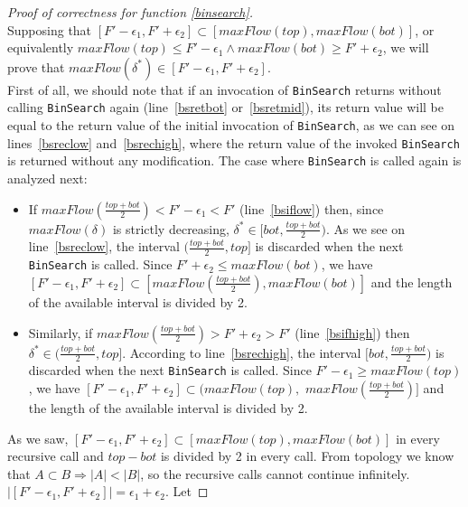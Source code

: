 \documentclass[11pt]{article}
\theoremstyle{definition}
\theoremstyle{corollary}
\theoremstyle{lemma}
\begin{document}
    \begin{proof}[Proof of correctness for function \ref{binsearch}] \ \\
       Supposing that $[F' - \epsilon_1, F' + \epsilon_2] \subset [maxFlow(top),maxFlow(bot)]$, or equivalently
       $maxFlow(top) \leq F' - \epsilon_1 \wedge maxFlow(bot) \geq F' + \epsilon_2$, we will prove that
       $maxFlow(\delta^*) \in [F' - \epsilon_1, F' + \epsilon_2]$. \\
       First of all, we should note that if an invocation of \texttt{BinSearch} returns without calling \texttt{BinSearch}
       again (line~\ref{bsretbot} or~\ref{bsretmid}), its return value will be equal to the return value of the initial
       invocation of \texttt{BinSearch}, as we can see on lines~\ref{bsreclow} and~\ref{bsrechigh}, where the return value of
       the invoked \texttt{BinSearch} is returned without any modification. The case where \texttt{BinSearch} is called again
       is analyzed next:
       \begin{itemize}
          \item If $maxFlow(\frac{top+bot}{2}) < F' - \epsilon_1 < F'$ (line~\ref{bsiflow}) then, since $maxFlow(\delta)$ is
          strictly decreasing, $\delta^* \in [bot,\frac{top+bot}{2})$. As we see on line~\ref{bsreclow}, the interval
          $(\frac{top+bot}{2}, top]$ is discarded when the next \texttt{BinSearch} is called. Since $F' + \epsilon_2 \leq
          maxFlow(bot)$, we have $[F' - \epsilon_1, F' + \epsilon_2] \subset [maxFlow(\frac{top+bot}{2}), maxFlow(bot)]$ and
          the length of the available interval is divided by 2.
          \item Similarly, if $maxFlow(\frac{top+bot}{2}) > F' + \epsilon_2 > F'$ (line~\ref{bsifhigh}) then $\delta^* \in
          (\frac{top+bot}{2}, top]$. According to line~\ref{bsrechigh}, the interval $[bot, \frac{top+bot}{2})$ is discarded
          when the next \texttt{BinSearch} is called. Since $F'- \epsilon_1 \geq maxFlow(top)$, we have $[F' - \epsilon_1, F'
          + \epsilon_2] \subset (maxFlow(top),$ $maxFlow(\frac{top+bot}{2})]$ and the length of the available interval is
          divided by 2.
       \end{itemize}
       As we saw, $[F' - \epsilon_1, F' + \epsilon_2] \subset [maxFlow(top),maxFlow(bot)]$ in every recursive call and
       $top - bot$ is divided by 2 in every call. From topology we know that $A \subset B \Rightarrow |A| < |B|$, so the
       recursive calls cannot continue infinitely. $|[F' - \epsilon_1, F' + \epsilon_2]| = \epsilon_1 + \epsilon_2$. Let

\end{proof}
\end{document}
